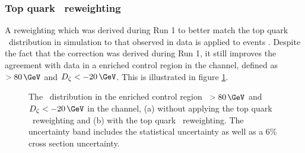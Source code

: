 \subsubsection*{Top quark \pT~reweighting}
A reweighting which was derived during Run 1
to better match the top quark \pT~distribution in simulation
to that observed in data is applied to \ttbar events \cite{topptrwt}. Despite
the fact that the correction was derived during Run 1, it still
improves the agreement with data in a \ttbar enriched
control region in the \emu channel, defined as 
\MET~$>80\,\GeV$ and $D_{\zeta}<-20\,\GeV$. This
is illustrated in figure \ref{fig:mssm_corrs_toppt}.
\begin{figure}[h!]
\begin{center}
\end{center}
\caption[The \mTtot~distribution in the \ttbar
enriched control region, with and without applying top quark \pT~reweighting.]{The \mTtot~distribution in the \ttbar enriched control region \MET~$>80\,\GeV$ and \mbox{$D_{\zeta}<-20\,\GeV$} in the \emu channel,
(a) without applying the top quark \pT~reweighting and (b) with the top quark \pT~reweighting.
The uncertainty band includes the statistical uncertainty as well as a 6\% \ttbar cross section uncertainty.}
\label{fig:mssm_corrs_toppt}
\end{figure}

